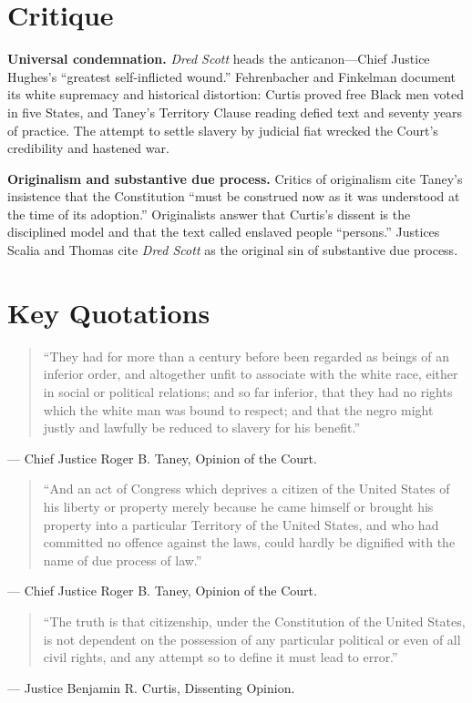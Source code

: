 \documentclass[12pt]{article}
\begin{document}
\section{Critique}

\textbf{Universal condemnation.} \textit{Dred Scott} heads the anticanon---Chief Justice Hughes's ``greatest self-inflicted wound.'' Fehrenbacher and Finkelman document its white supremacy and historical distortion: Curtis proved free Black men voted in five States, and Taney's Territory Clause reading defied text and seventy years of practice. The attempt to settle slavery by judicial fiat wrecked the Court's credibility and hastened war.

\textbf{Originalism and substantive due process.} Critics of originalism cite Taney's insistence that the Constitution ``must be construed now as it was understood at the time of its adoption.'' Originalists answer that Curtis's dissent is the disciplined model and that the text called enslaved people ``persons.'' Justices Scalia and Thomas cite \textit{Dred Scott} as the original sin of substantive due process.

\section{Key Quotations}

\begin{quote}
``They had for more than a century before been regarded as beings of an inferior order, and altogether unfit to associate with the white race, either in social or political relations; and so far inferior, that they had no rights which the white man was bound to respect; and that the negro might justly and lawfully be reduced to slavery for his benefit.''
\end{quote}
\noindent --- Chief Justice Roger B. Taney, Opinion of the Court.

\begin{quote}
``And an act of Congress which deprives a citizen of the United States of his liberty or property merely because he came himself or brought his property into a particular Territory of the United States, and who had committed no offence against the laws, could hardly be dignified with the name of due process of law.''
\end{quote}
\noindent --- Chief Justice Roger B. Taney, Opinion of the Court.

\begin{quote}
``The truth is that citizenship, under the Constitution of the United States, is not dependent on the possession of any particular political or even of all civil rights, and any attempt so to define it must lead to error.''
\end{quote}
\noindent --- Justice Benjamin R. Curtis, Dissenting Opinion.
\end{document}
